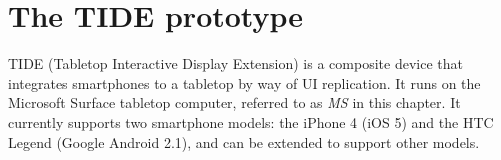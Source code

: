 

\chapter{The TIDE prototype}
\label{system}

TIDE (Tabletop Interactive Display Extension) is a composite device that integrates smartphones to a tabletop by way of UI replication.
It runs on the Microsoft Surface tabletop computer, referred to as \emph{MS} in this chapter.
It currently supports two smartphone models: the iPhone 4 (iOS 5) and the HTC Legend (Google Android 2.1), and can be extended to support other models.

